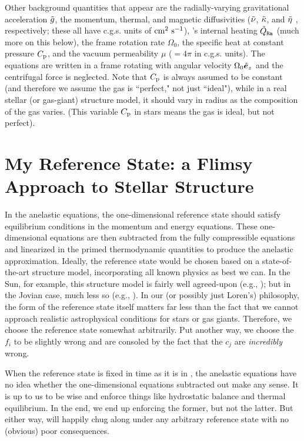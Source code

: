 \documentclass[12pt]{article}
\numberwithin{equation}{section}
\begin{document}
	Other background quantities that appear are the radially-varying gravitational acceleration $\tilde{g}$, the momentum, thermal, and magnetic diffusivities ($\tilde{\nu}$, $\tilde{\kappa}$, and $\tilde{\eta}$ , respectively; these all have c.g.s. units of $\rm{cm^2\ s^{-1}}$), {\rayleigh}'s internal heating $\tilde{Q}_{\texttt{Ra}}$ (much more on this below), the frame rotation rate $\Omega_0$, the specific heat at constant pressure $C_{\rm{p}}$, and the vacuum permeability $\mu$ ($=4\pi$ in c.g.s. units). The equations are written in a frame rotating with angular velocity $\Omega_0\hat{\bm{e}}_z$ and the centrifugal force is neglected. Note that $C_{\rm{p}}$ is always assumed to be constant (and therefore we assume the gas is ``perfect," not just ``ideal"), while in a real stellar (or gas-giant) structure model, it should vary in radius as the composition of the gas varies. (This variable $C_{\rm{p}}$ in stars means the gas is ideal, but not perfect). 
	
	\section{My Reference State: a Flimsy Approach to Stellar Structure}\label{sec:ref}
	In the anelastic equations, the one-dimensional reference state should satisfy equilibrium conditions in the momentum and energy equations. These one-dimensional equations are then subtracted from the fully compressible equations and linearized in the primed thermodynamic quantities to produce the anelastic approximation. Ideally, the reference state would be chosen based on a state-of-the-art structure model, incorporating all known physics as best we can. In the Sun, for example, this structure model is fairly well agreed-upon (e.g., \citealt{ChristensenDalsgaard1996}); but in the Jovian case, much less so (e.g., \citealt{Guillot2005}). In our (or possibly just Loren's) philosophy, the form of the reference state itself matters far less than the fact that we cannot approach realistic astrophysical conditions for stars or gas giants. Therefore, we choose the reference state somewhat arbitrarily. Put another way, we choose the $f_i$ to be slightly wrong and are consoled by the fact that the $c_j$ are \textit{incredibly} wrong. 
	
	When the reference state is fixed in time as it is in {\rayleigh}, the anelastic equations have no idea whether the one-dimensional equations subtracted out make any sense. It is up to us to be wise and enforce things like hydrostatic balance and thermal equilibrium. In the end, we end up enforcing the former, but not the latter. But either way, {\rayleigh} will happily chug along under any arbitrary reference state with no (obvious) poor consequences. 
	
\end{document}

